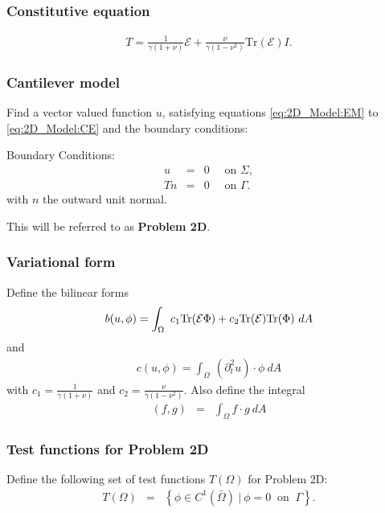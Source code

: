 			\subsubsection*{Constitutive equation}\label{sssec:2D_Model:ConstitutiveEquation}
			\begin{eqnarray}
				T = \frac{1}{\gamma(1+\nu)}\mathcal{E} + \frac{\nu}{\gamma(1-\nu^2)}\textrm{Tr}(\mathcal{E}) I. \label{eq:2D_Model:CE}
			\end{eqnarray}

		\subsubsection*{Cantilever model}

			Find a vector valued function $u$, satisfying equations \eqref{eq:2D_Model:EM} to \eqref{eq:2D_Model:CE} and the boundary conditions:

			Boundary Conditions:
			\begin{eqnarray*}
				u & = & 0 \quad \textrm{ on } \Sigma,\\
				Tn & = & 0 \quad \textrm{ on } \Gamma.
			\end{eqnarray*} with $n$ the outward unit normal.

			This will be referred to as \textbf{Problem 2D}.

		\subsubsection*{Variational form}\label{ssec:2D_Model:VariationalForm}
			Define the bilinear forms
			\begin{eqnarray}
				b(u,\phi) = \int_\Omega~c_1\textrm{Tr}({\cal E}\Phi)+ c_2\textrm{Tr}({\cal E})
				\textrm{Tr}(\Phi) ~dA \label{eq:2D_Model:Bilinear}
			\end{eqnarray}
			and
			\begin{eqnarray}
				c(u,\phi) = \int_\Omega~ (\partial^2_t u) \cdot \phi~dA \label{eq:2D_Model:Bilinear_c}
			\end{eqnarray}
			with $\displaystyle c_1 = \frac{1}{\gamma(1+\nu)}$ and $\displaystyle c_2 = \frac{\nu}{\gamma(1-\nu^2)}$.
			Also define the integral
			\begin{eqnarray}
				(f,g) &=& \int_{\Omega} f\cdot g \ dA \label{eq:2D_Model:Bilinear_int}
			\end{eqnarray}

			\subsubsection*{Test functions for Problem 2D}\label{sssec:2D_Model:TestFunctions2D1}
			Define the following set of test functions $T(\Omega)$ for Problem 2D:
			\begin{eqnarray*}
				T(\Omega) & = & \left\{ \phi \in C^1(\bar{\Omega}) \ | \ \phi = 0 \ \textrm{ on } \ \Gamma \right\}. 
			\end{eqnarray*}\label{sym:baromega}

